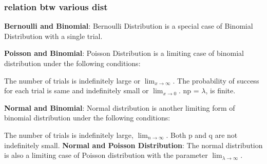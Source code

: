 \documentclass{beamer}
\begin{document}
\begin{frame}
\begin{figure}
\end{figure}
\end{frame}








\begin{frame}\frametitle{relation btw various dist}
\textbf{Bernoulli and Binomial}: Bernoulli Distribution is a special case of Binomial Distribution with a single trial.

\textbf{Poisson and Binomial}: Poisson Distribution is a limiting case of binomial distribution under the following conditions:

The number of trials is indefinitely large or $\displaystyle{\lim_{x \to \infty}}$.
The probability of success for each trial is same and indefinitely small or $\displaystyle{\lim_{x \to 0}}$.
np = $\lambda$, is finite.

\textbf{Normal and Binomial}: Normal distribution is another limiting form of binomial distribution under the following conditions:

The number of trials is indefinitely large, $\displaystyle{\lim_{n \to \infty}}$.
Both p and q are not indefinitely small.
\textbf{Normal and Poisson Distribution}:
The normal distribution is also a limiting case of Poisson distribution with the parameter $\displaystyle{\lim_{\lambda \to \infty}}$.



\end{frame}
\end{document}
